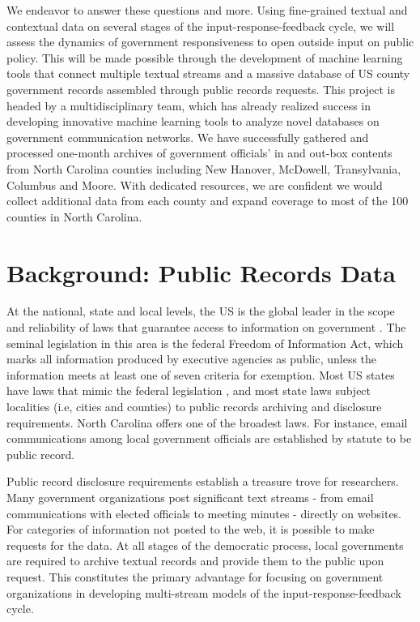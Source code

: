 We endeavor to answer these questions and more. Using fine-grained textual and contextual data on several stages of the input-response-feedback cycle, we will assess the dynamics of government responsiveness to open outside input on public policy. This will be made possible through the development of machine learning tools that connect multiple textual streams and a massive database of US county government records assembled through public records requests. This project is headed by a multidisciplinary team, which has already realized success in developing innovative machine learning tools to analyze novel databases on government communication networks. We have successfully gathered and processed one-month archives of government officials' in and out-box contents from North Carolina counties including New Hanover, McDowell, Transylvania, Columbus and Moore. With dedicated resources, we are confident we would collect additional data from each county and expand coverage to most of the 100 counties in North Carolina.


\section{Background: Public Records Data}

At the national, state and local levels, the US is the global leader in the scope and reliability of laws that guarantee access to information on government \cite{Halstuk2006}. The seminal legislation in this area is the federal Freedom of Information Act, which marks all information produced by executive agencies as public, unless the information meets at least one of seven criteria for exemption. Most US states have laws that mimic the federal legislation \cite{Braverman1980}, and most state laws subject localities (i.e, cities and counties) to public records archiving and disclosure requirements. North Carolina offers one of the broadest laws. For instance, email communications among local government officials are established by statute to be public record.

Public record disclosure requirements establish a treasure trove for researchers. Many government organizations post significant text streams - from email communications with elected officials to meeting minutes - directly on websites. For categories of information not posted to the web, it is possible to make requests for the data. At all stages of the democratic process, local governments are required to archive textual records and provide them to the public upon request. This constitutes the primary advantage for focusing on government organizations in developing multi-stream models of the input-response-feedback cycle.

